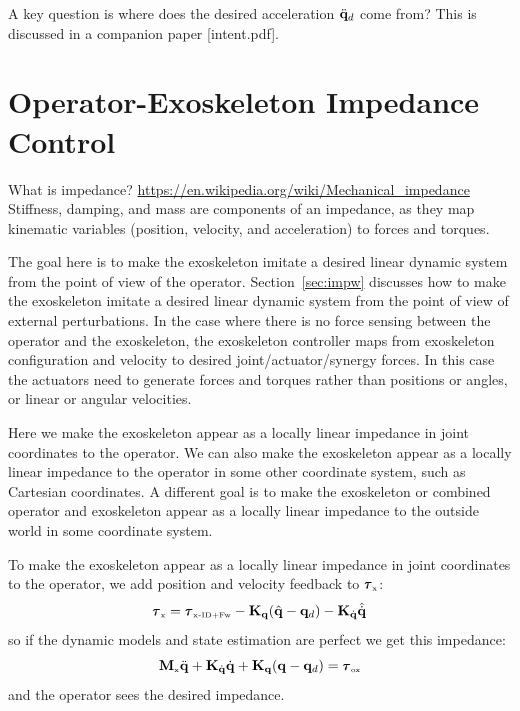 \documentclass[letterpaper,12pt,fullpage]{article}
\newcommand{\myx}{{\mbox {\tiny x}}}
\newcommand{\ox}{{\mbox {\tiny ox}}}
\newcommand{\xinvdynw}{{\mbox {\tiny x-ID+Fw}}}
\begin{document}
A key question is where does the desired acceleration $\ddot{{\bf q}}_d$ come from?
This is discussed in a companion paper [intent.pdf].

\section{Operator-Exoskeleton Impedance Control}

What is impedance?
\url{https://en.wikipedia.org/wiki/Mechanical_impedance}
Stiffness, damping, and mass are components of an impedance, as
they map kinematic variables (position, velocity, and acceleration)
to forces and torques.

The goal here is to make the exoskeleton imitate a desired linear dynamic system
from the point of view of the operator.
Section~\ref{sec:impw} discusses how to make the exoskeleton 
imitate a desired linear dynamic system 
from the point of view of external perturbations.
In the case where there is no force sensing between the operator and the
exoskeleton, the exoskeleton controller maps from exoskeleton configuration
and velocity to desired joint/actuator/synergy forces.
In this case the actuators need to generate forces and torques rather than
positions or angles, or linear or angular velocities.

Here we make the exoskeleton appear as a locally linear impedance in joint
coordinates to the operator.
We can also make the exoskeleton appear as a locally linear impedance to the
operator in some other coordinate system, such as Cartesian coordinates.
A different goal is to make the exoskeleton or combined operator and
exoskeleton appear as a locally linear impedance to
the outside world in some coordinate system.

To make the exoskeleton appear as a locally linear impedance in joint
coordinates to the operator, we add position and velocity feedback to $\vtau_{\myx}$:
\begin{equation}
\vtau_{\myx} = \vtau_{\xinvdynw} - \mK_{\vq} ( \hat{\vq} - \vq_d ) - \mK_{\dot{\vq}} \hat{\dot{\vq}}
\label{eq:impedance}
\end{equation}
so if the dynamic models and state estimation are perfect we get this impedance:
\begin{equation}
\mM_{\myx} \ddot{\vq} + \mK_{\dot{\vq}} \dot{\vq} + \mK_{\vq} ( \vq - \vq_d ) = \vtau_{\ox}
\end{equation}
and the operator sees the desired impedance.
\end{document}
